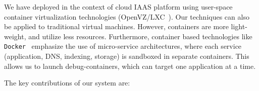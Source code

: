 We have deployed \parikshan in the context of cloud IAAS platform using user-space container virtualization technologies (OpenVZ/LXC~\cite{openvz,lxc}).
Our techniques can also be applied to traditional virtual machines. 
However, containers are more light-weight, and utilize less resources.
Furthermore, container based technologies like \texttt{Docker}~\cite{docker} emphasize the use of micro-service architectures, where each service (application, DNS, indexing, storage) is sandboxed in separate containers. 
This allows us to launch debug-containers, which can target one application at a time.

\noindent
The key contributions of our system are:
